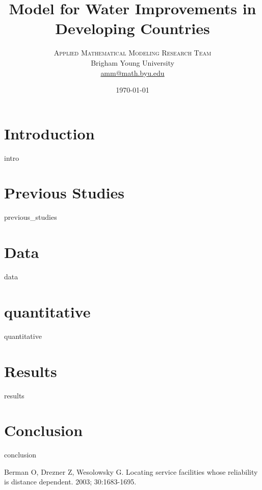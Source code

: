 \documentclass[twoside,twocolumn]{article}
\title{Model for Water Improvements in Developing Countries} %
\author{%
\textsc{Applied Mathematical Modeling Research Team}\\[1ex] %
\normalsize Brigham Young University  \\ %
\normalsize \href{mailto:amm@math.byu.edu}{amm@math.byu.edu} %
}
\date{\today} %
\begin{document}
\maketitle


\section{Introduction}
{intro}
\section{Previous Studies}
{previous_studies}
\section{Data}
{data}
\section{quantitative}
{quantitative}
\section{Results}
{results}
\section{Conclusion}
{conclusion}


\begin{thebibliography}{99} %

Berman O, Drezner Z, Wesolowsky G.
\newblock Locating service facilities whose reliability is distance dependent.
 2003; 30:1683-1695.

\end{thebibliography}

\newpage

\end{document}
